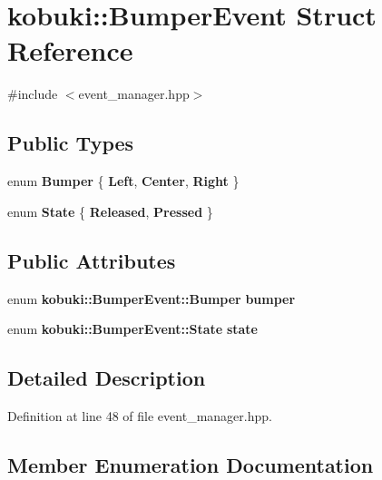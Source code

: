 \section{kobuki\-:\-:\-Bumper\-Event \-Struct \-Reference}
\label{structkobuki_1_1BumperEvent}


{\ttfamily \#include $<$event\-\_\-manager.\-hpp$>$}

\subsection*{\-Public \-Types}
\begin{DoxyCompactItemize}
\item 
enum {\bf \-Bumper} \{ {\bf \-Left}, 
{\bf \-Center}, 
{\bf \-Right}
 \}
\item 
enum {\bf \-State} \{ {\bf \-Released}, 
{\bf \-Pressed}
 \}
\end{DoxyCompactItemize}
\subsection*{\-Public \-Attributes}
\begin{DoxyCompactItemize}
\item 
enum {\bf kobuki\-::\-Bumper\-Event\-::\-Bumper} {\bf bumper}
\item 
enum {\bf kobuki\-::\-Bumper\-Event\-::\-State} {\bf state}
\end{DoxyCompactItemize}


\subsection{\-Detailed \-Description}


\-Definition at line 48 of file event\-\_\-manager.\-hpp.



\subsection{\-Member \-Enumeration \-Documentation}
